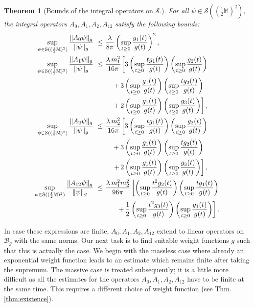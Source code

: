 \documentclass[b5paper,draft,openbib,12pt]{memoir}
\newtheorem{Thm}[Def]{Theorem}
\newcommand{\M}{\mathbb{M}}
\newcommand{\Banach}{\mathscr{B}}
\begin{document}
\begin{Thm}[Bounds of the integral operators on $\mathcal{S}$.]
	\label{thm:boundsKG}
	For all $\psi \in \mathcal{S}((\tfrac{1}{2}\M)^2)$, the integral operators $A_0, A_1, A_2, A_{12}$ satisfy the following bounds:
	\begin{align}
		\sup_{\psi \in \mathcal{S}((\frac{1}{2}\M)^2)} \frac{\| A_0 \psi \|_g}{\| \psi \|_g} ~\leq~& \frac{\lambda}{8\pi} \left(\sup_{t\geq 0} \frac{g_1(t)}{g(t)}\right)^2\label{eq:estimatea0},\\
%
  \sup_{\psi \in \mathcal{S}((\frac{1}{2}\M)^2)} \frac{\| A_1 \psi \|_g}{\| \psi \|_g} ~\leq~& \frac{\lambda \, m_1^2}{16\pi} \bigg[ 3\left(\sup_{t\geq 0}\frac{t g_1(t)}{g(t)}\right)\left(\sup_{t\geq 0}\frac{g_2(t)}{g(t)}\right) \notag\\
  &\quad+ 3\left( \sup_{t\geq 0} \frac{g_1(t)}{g(t)} \right)\left( \sup_{t\geq 0} \frac{tg_2(t)}{g(t)} \right) \nonumber\\
	&\quad\left. +\, 2 \left( \sup_{t\geq 0} \frac{g_1(t)}{g(t)} \right)\left( \sup_{t\geq 0} \frac{g_3(t)}{g(t)} \right) \right], \label{eq:estimatea1}\\
%
  \sup_{\psi \in \mathcal{S}((\frac{1}{2}\M)^2)} \frac{\| A_2 \psi \|_g}{\| \psi \|_g} ~\leq~& \frac{\lambda \, m_2^2}{16\pi} \bigg[ 3\left(\sup_{t\geq 0}\frac{t g_1(t)}{g(t)}\right)\left(\sup_{t\geq 0}\frac{g_2(t)}{g(t)}\right) \notag\\
  &\quad+ 3\left( \sup_{t\geq 0} \frac{g_1(t)}{g(t)} \right)\left( \sup_{t\geq 0} \frac{tg_2(t)}{g(t)} \right) \nonumber\\
	&\quad\left. + \, 2 \left( \sup_{t\geq 0} \frac{g_1(t)}{g(t)} \right)\left( \sup_{t\geq 0} \frac{g_3(t)}{g(t)} \right) \right], \label{eq:estimatea2}\\
	\sup_{\psi \in \mathcal{S}((\frac{1}{2}\M)^2)} \frac{\| A_{12} \psi \|_g}{\| \psi \|_g} ~\leq~& \frac{\lambda \, m_1^2 m_2^2}{96\pi} \left[ \left( \sup_{t\geq 0} \frac{t^2 g_2(t)}{g(t)}\right)\left( \sup_{t\geq 0} \frac{t g_1(t)}{g(t)}\right) \right.\nonumber\\
&~~~~~\left.+ \, \frac{1}{2}  \left( \sup_{t\geq 0} \frac{t^2 g_3(t)}{g(t)}\right)\left( \sup_{t\geq 0} \frac{g_1(t)}{g(t)}\right) \right].\label{eq:estimatea12}
	\end{align}
\end{Thm}
In case these expressions are finite, $A_0, A_1, A_2, A_{12}$ 
extend to linear operators on $\Banach_g$ with the same norms. Our 
next task is to find suitable weight functions $g$ such that this 
is actually the case. We begin with the massless case where already 
an exponential weight function leads to an estimate which remains 
finite after taking the supremum. The massive case is treated 
subsequently; it is a little more difficult as all the estimates 
for the operators $A_0, A_1, A_2, A_{12}$ have to be finite at 
the same time. This  requires a different choice of weight 
function (see Thm.\@ \ref{thm:existence}).
\end{document}
